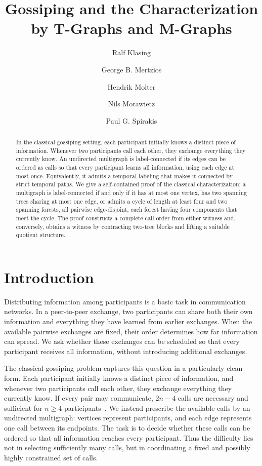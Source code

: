 \documentclass[USenglish, a4paper, thm-restate,numberwithinsect, cleveref]{lipics-v2021}
\title{Gossiping and the Characterization by T-Graphs and M-Graphs}
\author{Ralf Klasing}{CNRS, LaBRI, Université de Bordeaux, Talence, France}{ralf.klasing@labri.fr}{https://orcid.org/0009-0004-9421-8525}{Partially supported by the French ANR, project ANR-22-CE48-0001 (TEMPOGRAL)}
\author{George B. Mertzios}{Department of Computer Science, Durham University, UK}{george.mertzios@durham.ac.uk}{https://orcid.org/0000-0001-7182-585X}{Supported by the EPSRC grant EP/P020372/1.}
\author{Hendrik Molter}{Chair for Algorithm Engineering, Hasso Plattner Institute, Potsdam, Germany \and Department of Computer Science, Ben-Gurion~University~of~the~Negev, 
	Beer-Sheva, 
	Israel}{hendrik.molter@hpi.de}{https://orcid.org/0000-0002-4590-798X}{Supported by the Israel Science Foundation, grant nr.~1470/24, by the European Union's Horizon Europe research and innovation programme under grant agreement 949707, by the European Research Council, grant nr.~101039913 (PARAPATH), and by the Deutsche Forschungsgemeinschaft (DFG, German Research Foundation) -- 565381415.}
\author{Nils Morawietz}{Institute of Computer Science, Friedrich Schiller University Jena,  Germany}{nils.morawietz@uni-jena.de}{https://orcid.org/0000-0002-7283-4982}{%
}
\author{Paul G. Spirakis}{School  of Computer Science and Informatics, University of Liverpool, UK}{p.spirakis@liverpool.ac.uk}{https://orcid.org/0000-0001-5396-3749}{Supported by the EPSRC grant EP/P02002X/1.}
\begin{document}
\renewcommand{\theHtheorem}{\thesection.\arabic{theorem}}
\providecommand{\theHlemma}{}
\renewcommand{\theHlemma}{\thesection.\arabic{theorem}}
\providecommand{\theHcorollary}{}
\renewcommand{\theHcorollary}{\thesection.\arabic{theorem}}
\maketitle
\begin{abstract}
In the classical gossiping setting, each participant initially knows a
distinct piece of information. Whenever two participants call each
other, they exchange everything they currently know. An undirected
multigraph is label-connected if its edges can be ordered as calls so
that every participant learns all information, using each edge at most
once. Equivalently, it admits a temporal labeling that makes it
connected by strict temporal paths. We give a self-contained proof of
the classical characterization: a multigraph is label-connected if and
only if it has at most one vertex, has two spanning trees sharing at
most one edge, or admits a cycle of length at least four and two
spanning forests, all pairwise edge-disjoint, each forest having four
components that meet the cycle. The proof constructs a complete call
order from either witness and, conversely, obtains a witness by
contracting two-tree blocks and lifting a suitable quotient structure.
\end{abstract}

\section{Introduction}

Distributing information among participants is a basic task in
communication networks. In a peer-to-peer exchange, two participants
can share both their own information and everything they have learned
from earlier exchanges. When the available pairwise exchanges are
fixed, their order determines how far information can spread. We ask
whether these exchanges can be scheduled so that every participant
receives all information, without introducing additional exchanges.

The classical gossiping problem captures this question in a particularly
clean form.  Each participant initially knows a distinct piece of
information, and whenever two participants call each other, they
exchange everything they currently know.  If every pair may communicate,
$2n-4$ calls are necessary and sufficient for $n\geq4$
participants~\cite{BakerS72,HajnalMS72}.  We instead prescribe the
available calls by an undirected multigraph: vertices represent
participants, and each edge represents one call between its endpoints.
The task is to decide whether these calls can be ordered so that all
information reaches every participant.  Thus the difficulty lies not in
selecting sufficiently many calls, but in coordinating a fixed and
possibly highly constrained set of calls.
\end{document}
